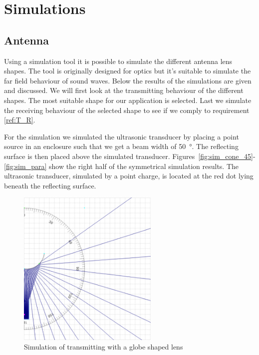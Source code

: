 \section{Simulations}

\subsection{Antenna}

Using a simulation tool \cite{Ultratool} it is possible to simulate the different antenna lens shapes.
The tool is originally designed for optics but it's suitable to simulate the far field behaviour of sound waves.
Below the results of the simulations are given and discussed.
We will first look at the transmitting behaviour of the different shapes.
The most suitable shape for our application is selected.
Last we simulate the receiving behaviour of the selected shape to see if we comply to requirement \ref{ref:T_R}.

For the simulation we simulated the ultrasonic transducer by placing a point source in an enclosure such that we get a beam width of \SI{50}{\degree}.
The reflecting surface is then placed above the simulated transducer.
Figures~\ref{fig:sim_cone_45}-\ref{fig:sim_para} show the right half of the symmetrical simulation results.
The ultrasonic transducer, simulated by a point charge, is located at the red dot lying beneath the reflecting surface.

\begin{figure}[H]
\centering
\includegraphics[width=0.6\textwidth]{Figures/sim_globe.PNG}
\caption{Simulation of transmitting with a globe shaped lens}
\label{fig:sim_globe}
\end{figure}

